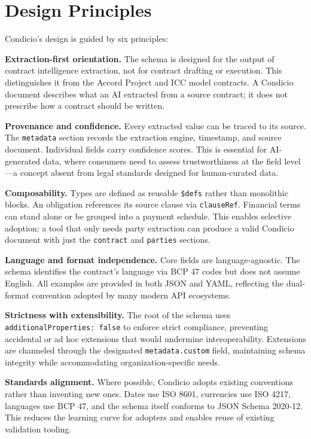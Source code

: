 \documentclass[11pt,a4paper]{article}
\begin{document}
\section{Design Principles}

Condicio's design is guided by six principles:

\textbf{Extraction-first orientation.} The schema is designed for the output of contract intelligence extraction, not for contract drafting or execution. This distinguishes it from the Accord Project and ICC model contracts. A Condicio document describes what an AI extracted from a source contract; it does not prescribe how a contract should be written.

\textbf{Provenance and confidence.} Every extracted value can be traced to its source. The \texttt{metadata} section records the extraction engine, timestamp, and source document. Individual fields carry confidence scores. This is essential for AI-generated data, where consumers need to assess trustworthiness at the field level---a concept absent from legal standards designed for human-curated data.

\textbf{Composability.} Types are defined as reusable \texttt{\$defs} rather than monolithic blocks. An obligation references its source clause via \texttt{clauseRef}. Financial terms can stand alone or be grouped into a payment schedule. This enables selective adoption: a tool that only needs party extraction can produce a valid Condicio document with just the \texttt{contract} and \texttt{parties} sections.

\textbf{Language and format independence.} Core fields are language-agnostic. The schema identifies the contract's language via BCP 47 codes but does not assume English. All examples are provided in both JSON and YAML, reflecting the dual-format convention adopted by many modern API ecosystems.

\textbf{Strictness with extensibility.} The root of the schema uses \texttt{additionalProperties: false} to enforce strict compliance, preventing accidental or ad hoc extensions that would undermine interoperability. Extensions are channeled through the designated \texttt{metadata.custom} field, maintaining schema integrity while accommodating organization-specific needs.

\textbf{Standards alignment.} Where possible, Condicio adopts existing conventions rather than inventing new ones. Dates use ISO 8601, currencies use ISO 4217, languages use BCP 47, and the schema itself conforms to JSON Schema 2020-12. This reduces the learning curve for adopters and enables reuse of existing validation tooling.
\end{document}
